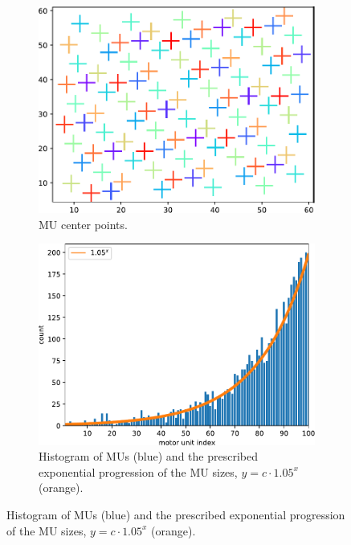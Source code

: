 \begin{figure}%
  \centering%
  \begin{subfigure}[t]{0.48\textwidth}%
    \centering%
    \includegraphics[width=\textwidth]{images/motor_unit_assignment/MU_fibre_distribution_67x67_100_mu_positions.pdf}%
    \caption{MU center points.}%
    \label{fig:MU_fibre_distribution_67x67_100_mu_positions}%
  \end{subfigure}
  \quad
  \begin{subfigure}[t]{0.48\textwidth}%
    \centering%
    \includegraphics[width=\textwidth]{images/motor_unit_assignment/MU_fibre_distribution_67x67_100_fiber_distribution.pdf}%
    \caption{Histogram of MUs (blue) and the prescribed exponential progression of the MU sizes, $y=c\cdot 1.05^x$ (orange).}%
    \label{fig:MU_fibre_distribution_67x67_100_fiber_distribution}%
  

\end{subfigure}
\end{figure}
